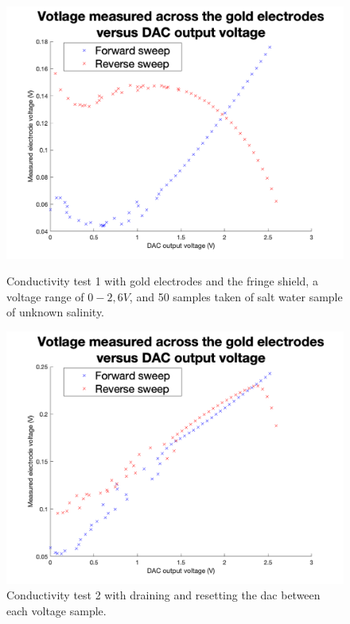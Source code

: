 \begin{figure}[ht]
    \begin{minipage}{0.5\textwidth}
        \centering
        \includegraphics[width=\textwidth]{Figures/Testing/Aus2}
        \caption{Conductivity test 1 with gold electrodes and the fringe shield, a voltage range of $0-2,6V$, and 50 samples taken of salt water sample of unknown salinity.}
        \label{fig:test1} %
    \end{minipage}
    \begin{minipage}{0.5\textwidth}
        \centering
        \includegraphics[width=\textwidth]{Figures/Testing/Aus3}
        \caption{Conductivity test 2 with draining and resetting the \gls{dac} between each voltage sample.}
        \label{fig:test2} %
    \end{minipage}
\end{figure}

